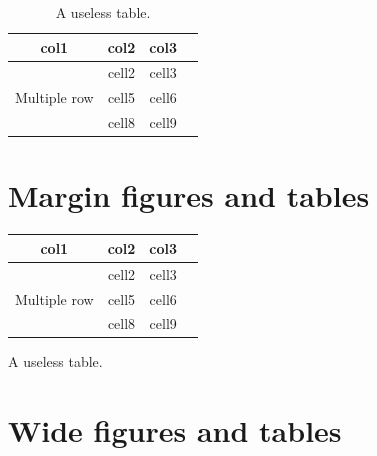 \blindtext

\begin{table}
\begin{tabular}{ |c|c|c|c| } 
\hline
col1 & col2 & col3 \\
\hline
\multirow{3}{4em}{Multiple row} & cell2 & cell3 \\ 
& cell5 & cell6 \\ 
& cell8 & cell9 \\ 
\hline
\end{tabular}
\caption{A useless table. \blindtext}
\end{table}

\blindtext

\section{Margin figures and tables}

\blindtext

\begin{margintable}[*-6]
\begin{tabular}{ |c|c|c|c| } 
\hline
col1 & col2 & col3 \\
\hline
\multirow{3}{4em}{Multiple row} & cell2 & cell3 \\ 
& cell5 & cell6 \\ 
& cell8 & cell9 \\ 
\hline
\end{tabular}
\caption{A useless table.}
\end{margintable}

\section{Wide figures and tables}
